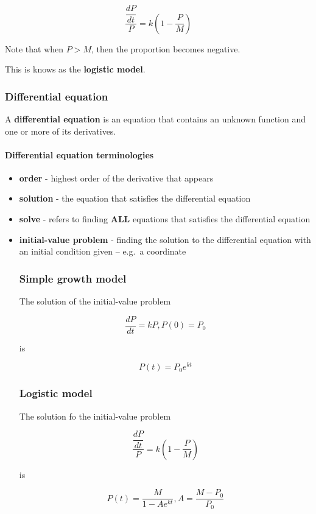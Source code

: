 \documentclass[
]{article}
\begin{document}
\[\frac{\dfrac{dP}{dt}}{P} = k\left(1-\frac{P}{M}\right)\]

Note that when \(P > M\), then the proportion becomes negative.

This is knows as the \textbf{logistic model}.

\hypertarget{differential-equation}{%
\subsubsection{Differential equation}\label{differential-equation}}

A \textbf{differential equation} is an equation that contains an unknown
function and one or more of its derivatives.

\hypertarget{differential-equation-terminologies}{%
\paragraph*{Differential equation
terminologies}\label{differential-equation-terminologies}}

\begin{itemize}
\item
  \textbf{order} - highest order of the derivative that appears
\item
  \textbf{solution} - the equation that satisfies the differential
  equation
\item
  \textbf{solve} - refers to finding \textbf{ALL} equations that
  satisfies the differential equation
\item
  \textbf{initial-value problem} - finding the solution to the
  differential equation with an initial condition given -- e.g.~a
  coordinate

  \hypertarget{simple-growth-model}{%
  \subsubsection{Simple growth model}\label{simple-growth-model}}

  The solution of the initial-value problem

  \[ \frac{dP}{dt} = kP, P(0) = P_0 \]

  is

  \[P(t) = P_0e^{kt} \]

  \hypertarget{logistic-model}{%
  \subsubsection{Logistic model}\label{logistic-model}}

  The solution fo the initial-value problem

  \[\dfrac{\dfrac{dP}{dt}}{P} = k \left(1-\frac{P}{M}\right)\]

  is

  \[ P(t) = \frac{M}{1-Ae^{kt}}, A = \frac{M-P_0}{P_0} \]
\end{itemize}
\end{document}
